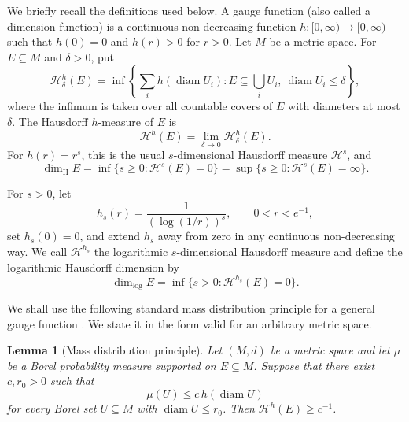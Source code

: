 \documentclass[11pt]{article}
\newtheorem{lemma}[theorem]{Lemma}
\theoremstyle{remark}
\newcommand{\Haus}{\mathcal{H}}
\newcommand{\vp}[1]{{\color{red}  {#1}}}
\begin{document}
We briefly recall the definitions used below.  A gauge function (also called
a dimension function) is a continuous non-decreasing function
$h:[0,\infty)\to[0,\infty)$ such that $h(0)=0$ and $h(r)>0$ for $r>0$.
Let $M$ be a metric space. For $E\subseteq M$ and $\delta>0$, put
\begin{equation} \label{eq:hausdorff-content}
    \Haus^h_\delta(E)
    =\inf\left\{\sum_i h(\operatorname{diam}U_i):
      E\subseteq\bigcup_iU_i,\ \operatorname{diam}U_i\leq\delta\right\},
\end{equation}
where the infimum is taken over all countable covers of $E$ with
diameters at most $\delta$.  The Hausdorff $h$-measure of $E$ is
\begin{equation} \label{eq:hausdorff-measure}
    \Haus^h(E)=\lim_{\delta\to0}\Haus^h_\delta(E).
\end{equation}
For $h(r)=r^s$, this is the usual $s$-dimensional Hausdorff measure
$\Haus^s$, and
\begin{equation} \label{eq:hausdorff-dimension}
    \dim_{\mathrm H}E
    =\inf\{s\geq0:\Haus^s(E)=0\}
    =\sup\{s\geq0:\Haus^s(E)=\infty\}.
\end{equation}

For $s>0$, let
\[
    h_s(r)=\frac{1}{(\log(1/r))^s},
    \qquad 0<r<e^{-1},
\]
set $h_s(0)=0$, and extend $h_s$ away from zero in any continuous
non-decreasing way.  We call $\Haus^{h_s}$ the logarithmic
$s$-dimensional Hausdorff measure and define the logarithmic Hausdorff
dimension by
\begin{equation} \label{eq:log-dimension}
    \dim_{\log}E
    =\inf\{s>0:\Haus^{h_s}(E)=0\}.
\end{equation}

We shall use the following standard mass distribution principle for a general
gauge function \cite[Section~2.1]{BeresnevichVelani2006}.  We state it in the
form valid for an arbitrary metric space.
\begin{lemma}[Mass distribution principle]
Let $(M,d)$ be a metric space and let $\mu$ be a Borel probability measure
supported on $E\subseteq M$.
Suppose that there exist $c,r_0>0$ such that
\begin{equation}\label{eq:mass-distribution-hypothesis}
    \mu(U)\leq c\,h(\operatorname{diam}U)
\end{equation}
for every Borel set $U\subseteq M$ with
$\operatorname{diam}U\leq r_0$.  Then
$\Haus^h(E)\geq c^{-1}$.
\end{lemma}

%
\end{document}
